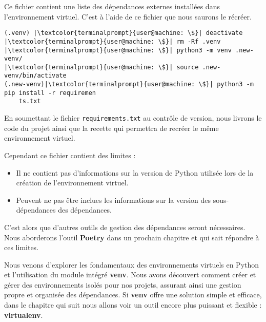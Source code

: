 Ce fichier contient une liste des dépendances externes installées dans l'environnement virtuel. C'est à l'aide de ce fichier que nous saurons le récréer.
\begin{lstlisting}[style=terminal]
(.venv) |\textcolor{terminalprompt}{user@machine: \$}| deactivate
|\textcolor{terminalprompt}{user@machine: \$}| rm -Rf .venv
|\textcolor{terminalprompt}{user@machine: \$}| python3 -m venv .new-venv/
|\textcolor{terminalprompt}{user@machine: \$}| source .new-venv/bin/activate
(.new-venv)|\textcolor{terminalprompt}{user@machine: \$}| python3 -m pip install -r requiremen
    ts.txt
\end{lstlisting}

En soumettant le fichier \texttt{requirements.txt} au contrôle de version, nous livrons le code du projet ainsi que la recette qui permettra de recréer le même environnement virtuel.

Cependant ce fichier contient des limites : 

\begin{itemize}
    \item Il ne contient pas d'informations sur la version de Python utilisée lors de la création de l'environnement virtuel.
    \item Peuvent ne pas être inclues les informations sur la version des sous-dépendances des dépendances.
\end{itemize}

C'est alors que d'autres outils de gestion des dépendances seront nécessaires. Nous aborderons l'outil \textbf{Poetry} dans un prochain chapitre et qui sait répondre à ces limites.
\bigskip

\begin{center}
\end{center}

Nous venons d'explorer les fondamentaux des environnements virtuels en Python et l'utilisation du module intégré \textbf{venv}. Nous avons découvert comment créer et gérer des environnements isolés pour nos projets, assurant ainsi une gestion propre et organisée des dépendances. Si \textbf{venv} offre une solution simple et efficace, dans le chapitre qui suit nous allons voir un outil encore plus puissant et flexible : \textbf{virtualenv}. 


